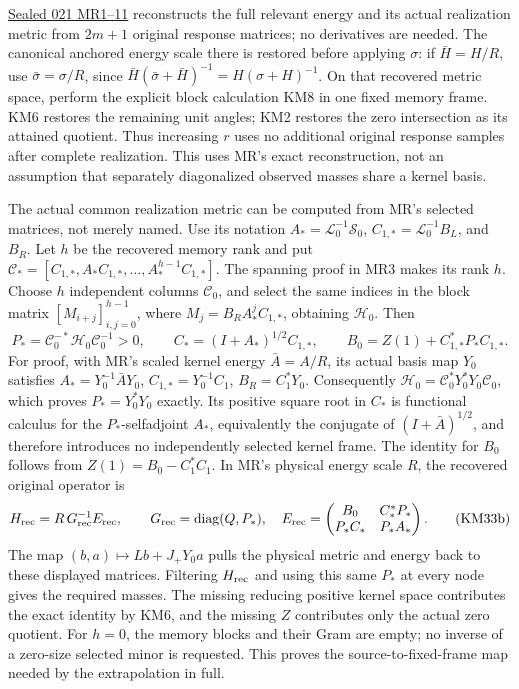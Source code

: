 \documentclass[11pt]{article}
\begin{document}
\href{https://github.com/KokunoYumeto/zeta-function-research-reader/blob/e40b46fde72c245dd79ef5691f59c21d6cbf0c75/workbenches/splitzero-tandem/continuations/20260922-original-observation-recovery/MATRIX_RECOVERY_PROOFS.md\#L7}{Sealed 021 MR1--11} reconstructs the full relevant energy and its actual realization metric from \(2m+1\) original response matrices; no derivatives are needed. The canonical anchored energy scale there is restored before applying \(\sigma\): if \(\bar H=H/R\), use \(\bar\sigma=\sigma/R\), since \(\bar H(\bar\sigma+\bar H)^{-1}=H(\sigma+H)^{-1}\). On that recovered metric space, perform the explicit block calculation KM8 in one fixed memory frame. KM6 restores the remaining unit angles; KM2 restores the zero intersection as its attained quotient. Thus increasing \(r\) uses no additional original response samples after complete realization. This uses MR's exact reconstruction, not an assumption that separately diagonalized observed masses share a kernel basis.

The actual common realization metric can be computed from MR's selected matrices, not merely named. Use its notation \(A_*=\mathcal L_0^{-1}\mathcal S_0\), \(C_{1,*}=\mathcal L_0^{-1}B_L\), and \(B_R\). Let \(h\) be the recovered memory rank and put \(\mathcal C_*=[C_{1,*},A_*C_{1,*},\ldots,A_*^{h-1}C_{1,*}]\). The spanning proof in MR3 makes its rank \(h\). Choose \(h\) independent columns \(\mathcal C_0\), and select the same indices in the block matrix \([M_{i+j}]_{i,j=0}^{h-1}\), where \(M_j=B_RA_*^jC_{1,*}\), obtaining \(\mathcal H_0\). Then \[
 P_*=\mathcal C_0^{-*}\mathcal H_0\mathcal C_0^{-1}>0,\qquad
 C_*=(I+A_*)^{1/2}C_{1,*},\qquad
 B_0=Z(1)+C_{1,*}^*P_*C_{1,*}.
 \tag{KM33a}
\] For proof, with MR's scaled kernel energy \(\bar A=A/R\), its actual basis map \(Y_0\) satisfies \(A_*=Y_0^{-1}\bar A Y_0\), \(C_{1,*}=Y_0^{-1}C_1\), \(B_R=C_1^*Y_0\). Consequently \(\mathcal H_0=\mathcal C_0^*Y_0^*Y_0\mathcal C_0\), which proves \(P_*=Y_0^*Y_0\) exactly. Its positive square root in \(C_*\) is functional calculus for the \(P_*\)-selfadjoint \(A_*\), equivalently the conjugate of \((I+\bar A)^{1/2}\), and therefore introduces no independently selected kernel frame. The identity for \(B_0\) follows from \(Z(1)=B_0-C_1^*C_1\). In MR's physical energy scale \(R\), the recovered original operator is \[
 H_{\rm rec}=R\,G_{\rm rec}^{-1}E_{\rm rec},\qquad
 G_{\rm rec}=\operatorname{diag}(Q,P_*),\quad
 E_{\rm rec}=
 \begin{pmatrix}B_0&C_*^*P_*\\P_*C_*&P_*A_*\end{pmatrix}.
 \tag{KM33b}
\] The map \((b,a)\mapsto Lb+J_+Y_0a\) pulls the physical metric and energy back to these displayed matrices. Filtering \(H_{\rm rec}\) and using this same \(P_*\) at every node gives the required masses. The missing reducing positive kernel space contributes the exact identity by KM6, and the missing \(Z\) contributes only the actual zero quotient. For \(h=0\), the memory blocks and their Gram are empty; no inverse of a zero-size selected minor is requested. This proves the source-to-fixed-frame map needed by the extrapolation in full.
\end{document}
